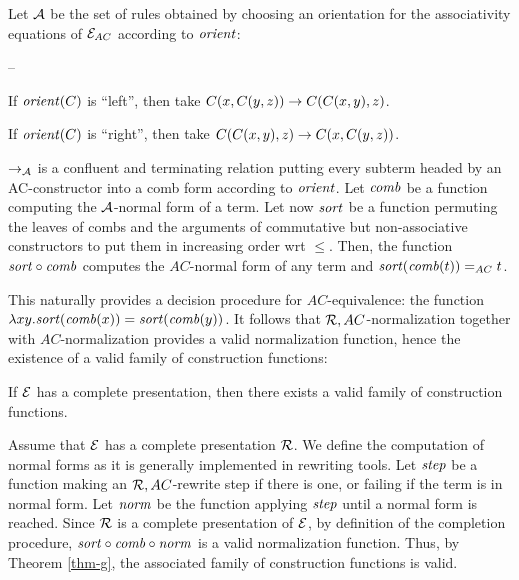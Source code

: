 \begin{prf}
Let $\mathcal{A}$ be the set of rules obtained by choosing an orientation for
the associativity equations of $\mathcal{E}_{AC}$ according to $\mathit{orient}$:

\begin{lst}{--}
\item If $\mathit{orient}(C)$ is ``left'', then take $C(x,C(y,z))\rightarrow C(C(x,y),z)$.
\item If $\mathit{orient}(C)$ is ``right'', then take $C(C(x,y),z)\rightarrow C(x,C(y,z))$.
\end{lst}

$\rightarrow_\mathcal{A}$ is a confluent and terminating relation putting every subterm
headed by an AC-constructor into a comb form according to
$\mathit{orient}$. Let $\mathit{comb}$ be a function computing the $\mathcal{A}$-normal form
of a term. Let now $\mathit{sort}$ be a function permuting the leaves of combs
and the arguments of commutative but non-associative constructors to
put them in increasing order wrt $\le$. Then, the function
$\mathit{sort}\circ\mathit{comb}$ computes the $AC$-normal form of any term and
$\mathit{sort}(\mathit{comb}(t))=_{AC} t$.\cqfd\\
\end{prf}


This naturally provides a decision procedure for $AC$-equivalence: the
function $\lambda xy.\mathit{sort}(\mathit{comb}(x))=\mathit{sort}(\mathit{comb}(y))$. It follows that
$\mathcal{R},AC$-normalization together with $AC$-normalization provides a
valid normalization function, hence the existence of a valid family of
construction functions:

\begin{thm}
\label{thm-ex}
If $\mathcal{E}$ has a complete presentation, then there exists a valid family
of construction functions.
\end{thm}

\begin{prf}
Assume that $\mathcal{E}$ has a complete presentation $\mathcal{R}$. We define the
computation of normal forms as it is generally implemented in
rewriting tools. Let $\mathit{step}$ be a function making an $\mathcal{R},AC$-rewrite
step if there is one, or failing if the term is in normal form. Let
$\mathit{norm}$ be the function applying $\mathit{step}$ until a normal form is
reached. Since $\mathcal{R}$ is a complete presentation of $\mathcal{E}$, by
definition of the completion procedure, $\mathit{sort}\circ\mathit{comb}\circ\mathit{norm}$ is
a valid normalization function. Thus, by Theorem \ref{thm-g}, the
associated family of construction functions is valid.\cqfd\\
\end{prf}

